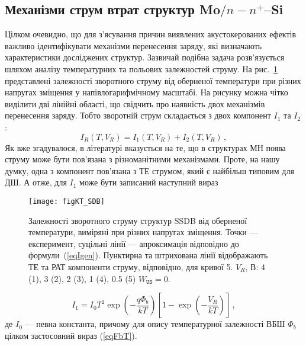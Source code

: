 \subsection{Механізми струм втрат структур Mo$/n-n^+$--Si}

Цілком очевидно, що для з'ясування причин виявлених акустокерованих ефектів важливо ідентифікувати
механізми перенесення заряду, які визначають характеристики досліджених структур.
Зазвичай подібна задача розв'язується шляхом аналізу температурних та польових залежностей струму.
На рис.~\ref{figKT_SDB} представлені залежності зворотного струму від оберненої температури при різних напругах зміщення
у напівлогарифмічному масштабі.
На рисунку можна чітко виділити дві лінійні області, що свідчить про наявність двох механізмів
перенесення заряду.
Тобто зворотній струм складається з двох компонент $I_{1}$ та $I_2$:
\begin{equation}\label{eqIsum}
    I_R(T,V_R)=I_1(T,V_R)+I_2(T,V_R)\,,
\end{equation}
Як вже згадувалося, в літературі вказується на те, що в структурах МН поява струму може бути пов'язана з
різноманітними механізмами.
Проте, на нашу думку, одна з компонент пов'язана з ТЕ струмом, який є найбільш типовим для ДШ.
А отже, для $I_1$ може бути записаний наступний вираз

\begin{figure}
\center
\texttt{[image: figKT\_SDB]}
\caption{\label{figKT_SDB}
Залежності зворотного струму структур SSDB від оберненої температури,
виміряні при різних напругах зміщення.
Точки --- експеримент,
суцільні лінії --- апроксимація відповідно до формули~(\ref{eqIgen}).
Пунктирна та штрихована лінії відображають ТЕ та РАТ компоненти струму, відповідно, для кривої 5.
$V_R$, В: 4 (1), 3 (2), 2 (3), 1 (4), 0.5 (5)
$W_\mathtt{US}=0$.
}%
\end{figure}

\begin{equation}\label{eqIte_SDB}
    I_1=I_0T^2\exp\left(-\frac{q\Phi_b}{kT}\right)\left[1-\exp\left(-\frac{V_R}{kT}\right)\right]\,,
\end{equation}
де $I_0$ --- певна константа,
причому для опису температурної залежності ВБШ $\Phi_b$ цілком застосовний вираз (\ref{eqFbT}).

